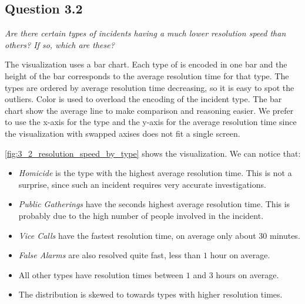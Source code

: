 \subsection*{Question 3.2}
\textit{Are there certain types of incidents having a much lower resolution speed than others? If so, which are these?}

The visualization uses a bar chart.
Each type of is encoded in one bar and the height of the bar corresponds to the average resolution time for that type.
The types are ordered by average resolution time decreasing, so it is easy to spot the outliers.
Color is used to overload the encoding of the incident type.
The bar chart show the average line to make comparison and reasoning easier.
We prefer to use the x-axis for the type and the y-axis for the average resolution time since the visualization with swapped axises does not fit a single screen.

\cref{fig:3_2_resolution_speed_by_type} shows the visualization.
We can notice that:
\begin{itemize}
    \item \textit{Homicide} is the type with the highest average resolution time. This is not a surprise, since such an incident requires very accurate investigations.
    \item \textit{Public Gatherings} have the seconds highest average resolution time. This is probably due to the high number of people involved in the incident.
    \item \textit{Vice Calls} have the fastest resolution time, on average only about $30$ minutes.
    \item \textit{False Alarms} are also resolved quite fast, less than $1$ hour on average.
    \item All other types have resolution times between $1$ and $3$ hours on average.
    \item The distribution is skewed to towards types with higher resolution times.
\end{itemize}

